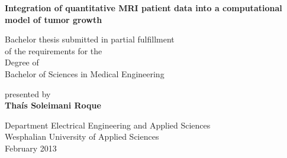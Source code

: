 
\begin{titlepage}
       \begin{center}
           {\Huge \textbf{
             Integration of quantitative MRI patient data into a computational model of tumor growth}\par}
           \vspace{4cm}
           {\Large Bachelor thesis submitted in partial fulfillment \\
           of the requirements for the\\
           Degree of\\
           Bachelor of Sciences in Medical Engineering\\
}
\vspace{2cm}

\large{presented by}\\

\Large{\textbf{Tha\'{i}s Soleimani Roque}}


\vfill

{\normalsize Department Electrical Engineering and Applied Sciences
           \\Wesphalian University of Applied Sciences\\[2ex]February 2013}


       \end{center}
   \end{titlepage}

\newpage
{}
\thispagestyle{empty}
\hspace{1cm}

\newpage
\normalsize



